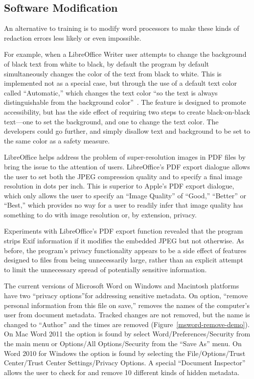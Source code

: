 \subsection{Software Modification}

An alternative to training is to modify
word processors to make these kinds of redaction errors less likely or even impossible.

For example, when a LibreOffice Writer user attempts to change the
background of black text from white to black,  by default the program by default
simultaneously changes the color of the text from black to white. This is implemented not as a special case, but
through the use of a  default text color called ``Automatic,'' which
changes the text color ``so the text is always distinguishable from the background
color''~\cite{libreoffice-accessibility}. The feature is designed to
promote accessibility, but has the side effect of requiring two steps
to create black-on-black text---one  to set the background, and
one  to change the text color. The developers could go 
further, and simply disallow text and background to be set to the same
color as a safety measure.

LibreOffice helps address the problem of super-resolution images in
PDF files by bring the issue to the attention of users. 
LibreOffice's PDF export dialogue allows the user to set both the JPEG
compression quality and to specify a final image resolution in dots
per inch. This is superior to
Apple's PDF export dialogue, which only allows the user to specify
an ``Image Quality'' of ``Good,'' ``Better'' or ``Best,'' which provides no way for a user to readily
infer that image quality has something to do with image resolution or,
by extension, privacy.

Experiments with LibreOffice's PDF export function revealed that the
program strips Exif information if it modifies the embedded JPEG but
not otherwise. As before, the program's privacy functionality appears to
be a side effect of features designed to files from being
unnecessarily large, rather than an explicit attempt to limit the
unnecessary spread of potentially sensitive information. 

The current versions of Microsoft Word on Windows and Macintosh
platforms have two ``privacy options''for addressing sensitive metadata. On
option, ``remove personal information from this file on save,''
removes the names of the computer's user from document
metadata. Tracked changes are not removed, but the name is changed
to ``Author'' and the times are removed
(Figure~\ref{msword-remove-demo}). On Mac Word 2011 the option is found by
select Word/Preferences/Security from the main menu or Options/All
Options/Security from the ``Save As'' menu. On Word 2010 for Windows
the option is found by selecting the File/Options/Trust Center/Trust
Center Settings/Privacy Options. A special ``Document Inspector''
allows the user to check for and remove 10 different kinds of hidden
metadata. 

